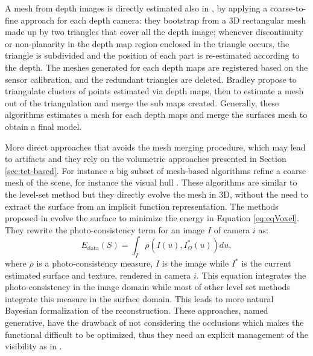 A mesh from depth images is directly estimated also in \cite{pollefeys_et_al_08}, by applying a coarse-to-fine approach for each depth camera: they bootstrap from a 3D rectangular mesh made up by two triangles that cover all the depth image; whenever discontinuity or non-planarity in the depth map region enclosed in the triangle occurs, the triangle is subdivided and the position of each part is re-estimated according to the depth. The meshes generated for each depth maps are registered based on  the sensor calibration, and the redundant triangles are deleted.
Bradley \etal \cite{bradley2008accurate} propose to triangulate clusters of points  estimated via depth maps, then to estimate a mesh out of the triangulation and merge the sub maps created.
Generally, these algorithms estimates a mesh for each depth maps and merge the surfaces mesh to obtain a final model.

More direct approaches that avoids the mesh merging procedure, which may lead to artifacts and they rely on the volumetric approaches presented in Section \ref{sec:tet-based}.
For instance a big subset of mesh-based algorithms refine a coarse mesh of the scene, for instance the visual hull \cite{hiep2009towards,zaharescu2007transformesh,delaunoy_et_al_08,gargallo2007minimizing,delaunoy2011gradient,vu2011large}. These algorithms are similar to the level-set method but they directly evolve the mesh in 3D, without the need to extract the surface from an implicit function representation.
The methods proposed in \cite{delaunoy_et_al_08,gargallo2007minimizing,delaunoy2011gradient} evolve the surface to minimize the energy in Equation \eqref{eq:eqVoxel}. They rewrite the photo-consistency term for an image $I$ of camera $i$ as:
\begin{equation}
\label{eq:generative}
  E_{\text{data}}(S) = \int_{\mathit{I}} \rho\left(I(\mathit{u}), I^*_{\Omega}(\mathit{u})\right) d\mathit{u},
\end{equation}
where $\rho$ is a photo-consistency measure, $I$ is the image while $I^*$ is the current estimated surface and texture, rendered in camera $i$.
This equation integrates the photo-consistency in the image domain while most of other level set methods integrate this measure in the surface domain. This leads to more natural Bayesian formalization of the reconstruction. 
These approaches, named generative, have the drawback of not considering the occlusions which makes the functional difficult to be optimized, thus they need an explicit management of the visibility as in \cite{delaunoy2011gradient}.

